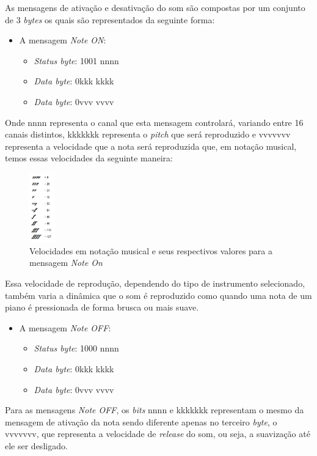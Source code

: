 \documentclass[12pt]{report}
\begin{document}
As mensagens de ativação e desativação do som são compostas por um conjunto de 3 {\it bytes} os quais são representados da seguinte forma:
\begin{itemize}
  \item A mensagem {\it Note ON}:
  \begin{itemize}
    \item {\it Status byte}: 1001 nnnn
    \item {\it Data byte}: 0kkk kkkk
    \item {\it Data byte}: 0vvv vvvv
  \end{itemize}
\end{itemize}

Onde nnnn representa o canal que esta mensagem controlará, variando entre 16 canais distintos, kkkkkkk representa o {\it pitch} que será reproduzido e vvvvvvv representa a velocidade que a nota será reproduzida que, em notação musical, temos essas velocidades da seguinte maneira:

\begin{figure}[h!]
  \centering
    \includegraphics[width=0.1\textwidth]{imagens/nuance-velocity-table.jpg}
    \caption{Velocidades em notação musical e seus respectivos valores para a mensagem {\it Note On}}
  \label{fig:Velocidades em notação musical}
\end{figure}

Essa velocidade de reprodução, dependendo do tipo de instrumento selecionado, também varia a dinâmica que o som é reproduzido como quando uma nota de um piano é pressionada de forma brusca ou mais suave.
\begin{itemize}
  \item A mensagem {\it Note OFF}:
  \begin{itemize}
    \item {\it Status byte}: 1000 nnnn
    \item {\it Data byte}: 0kkk kkkk
    \item {\it Data byte}: 0vvv vvvv
  \end{itemize}
\end{itemize}

Para as mensagens {\it Note OFF}, os {\it bits} nnnn e kkkkkkk representam o mesmo da mensagem de ativação da nota sendo diferente apenas no terceiro {\it byte}, o vvvvvvv, que representa a velocidade de {\it release} do som, ou seja, a suavização até ele ser desligado.
\end{document}
